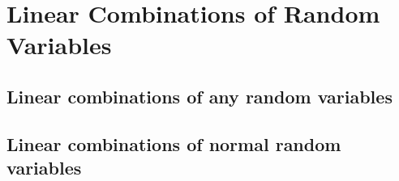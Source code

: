\chapter{Linear Combinations of Random Variables}

\section{Linear combinations of any random variables}
\section{Linear combinations of normal random variables}